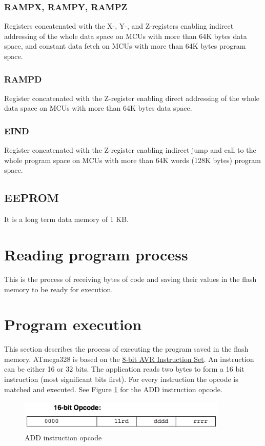 \subsubsection{RAMPX, RAMPY, RAMPZ}
Registers concatenated with the X-, Y-, and Z-registers enabling indirect addressing of the whole data space on MCUs with more than 64K bytes data space, and constant data fetch on MCUs with more than 64K bytes program space. 
				
\subsubsection{RAMPD}
Register concatenated with the Z-register enabling direct addressing of the whole data space on MCUs with more than 64K bytes data space. 
	
\subsubsection{EIND}
Register concatenated with the Z-register enabling indirect jump and call to the whole program space on MCUs with more than 64K words (128K bytes) program space. 
				
\subsection{EEPROM}
It is a long term data memory of 1 KB.


\section{Reading program process}
This is the process of receiving bytes of code and saving their values in the flash memory to be ready for execution.

\section{Program execution}

This section describes the process of executing the program saved in the flash memory. ATmega328 is based on the \href{http://www.atmel.com/images/doc0856.pdf}{8-bit AVR Instruction Set}. An instruction can be either 16 or 32 bits. The application reads two bytes to form a 16 bit instruction (most significant bits first). For every instruction the opcode is matched and executed. See Figure \ref{InstructionOpcodeExample} for the ADD instruction opcode.

\begin{figure}[h!]
\centering
\includegraphics[height=1.5cm, width=10cm]{opcode.png}
\caption{ADD instruction opcode \protect\cite{opcode:URL}}
\label{InstructionOpcodeExample}
\end{figure}

